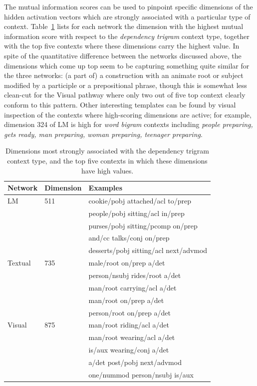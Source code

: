 The mutual information scores can be used to pinpoint specific
dimensions of the hidden activation vectors which are strongly
associated with a particular type of
context. Table~\ref{tab:mi-examples} lists for each network the
dimension with the highest mutual information score with respect to
the {\it dependency trigram} context type, together with the top
five contexts where these dimensions carry the highest value. In spite
of the quantitative difference between the networks discussed above,
the dimensions which come up top seem to be capturing something quite
similar for the three networks: (a part of) a construction with an
animate root or subject modified by a participle or a prepositional
phrase, though this is somewhat less clean-cut for the {\sc Visual}
pathway where only two out of five top context clearly conform to this
pattern.  Other interesting templates can be found by visual
inspection of the contexts where high-scoring dimensions are active;
for example, dimension 324 of {\sc LM} is high for {\it word bigram} 
contexts including
{\it people preparing, gets ready, man preparing, woman preparing,
  teenager preparing}.

\begin{table}
  \centering
  \caption{Dimensions most strongly associated with the dependency trigram context type, and the top five contexts in which these dimensions have high values.} 
\label{tab:mi-examples}
\begin{tabular}{lll}
  Network            & Dimension & Examples         \\\hline
  {\sc LM}           & 511       & cookie/pobj attached/acl to/prep \\
                     &           & people/pobj sitting/acl in/prep \\
                     &           & purses/pobj sitting/pcomp on/prep\\
                     &           & and/cc talks/conj on/prep \\
                     &           & desserts/pobj sitting/acl next/advmod \\\hline
  {\sc Textual}      & 735       & male/root on/prep a/det        \\
                     &           & person/nsubj rides/root a/det   \\
                     &           & man/root carrying/acl a/det \\
                     &           & man/root on/prep a/det         \\
                     &           & person/root on/prep a/det       \\\hline
  {\sc Visual}       &  875      & man/root riding/acl a/det \\
                     &           & man/root wearing/acl a/det \\
                     &           & is/aux wearing/conj a/det \\
                     &           & a/det post/pobj next/advmod \\
                     &           & one/nummod person/nsubj is/aux \\
\end{tabular}
\end{table}
